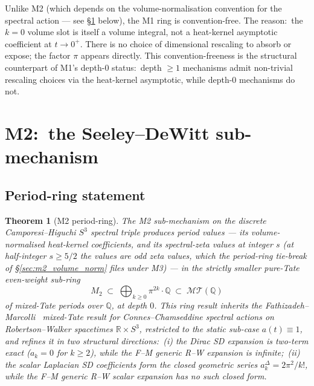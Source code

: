 \documentclass[11pt,a4paper]{article}
\theoremstyle{plain}
\newtheorem{theorem}{Theorem}[section]
\theoremstyle{definition}
\newcommand{\sthree}{S^{3}}
\newcommand{\R}{\mathbb{R}}
\newcommand{\Q}{\mathbb{Q}}
\newcommand{\MT}{\mathcal{MT}}
\begin{document}
Unlike M2 (which depends on the volume-normalisation convention for
the spectral action --- see \S\ref{sec:m2} below), the M1 ring is
convention-free.  The reason:\ the $k = 0$ volume slot is itself a
volume integral, not a heat-kernel asymptotic coefficient at $t \to 0^+$.
There is no choice of dimensional rescaling to absorb or expose; the
factor $\pi$ appears directly.  This convention-freeness is the
structural counterpart of M1's depth-$0$ status:\ depth $\ge 1$
mechanisms admit non-trivial rescaling choices via the heat-kernel
asymptotic, while depth-$0$ mechanisms do not.

\section{M2:\ the Seeley--DeWitt sub-mechanism}
\label{sec:m2}

\subsection{Period-ring statement}

\begin{theorem}[M2 period-ring]
\label{thm:m2_mixed_tate}
The M2 sub-mechanism on the discrete Camporesi--Higuchi $\sthree$
spectral triple produces period values --- its volume-normalised
heat-kernel coefficients, and its spectral-zeta values at
\emph{integer} $s$ (at half-integer $s \ge 5/2$ the values are odd zeta
values, which the period-ring tie-break of \S\ref{sec:m2_volume_norm}
files under M3) --- in the strictly smaller
pure-Tate even-weight sub-ring
\begin{equation}
\label{eq:m2_ring}
M_2 \;\subset\; \bigoplus_{k \ge 0} \pi^{2k}\cdot\Q
\;\subset\; \MT(\Q)
\end{equation}
of mixed-Tate periods over $\Q$, at depth $0$.  This ring result
inherits the Fathizadeh--Marcolli~\cite{fathizadeh_marcolli2016}
mixed-Tate result for Connes--Chamseddine spectral actions on
Robertson--Walker spacetimes $\R \times \sthree$, restricted to the
static sub-case $a(t) \equiv 1$, and refines it in two structural
directions:\ (i) the Dirac SD expansion is two-term exact ($a_k = 0$
for $k \ge 2$), while the F--M generic R--W expansion is infinite;\
(ii) the scalar Laplacian SD coefficients form the closed
geometric series $a_k^\Delta = 2\pi^2/k!$, while the F--M generic
R--W scalar expansion has no such closed form.
\end{theorem}
\end{document}
